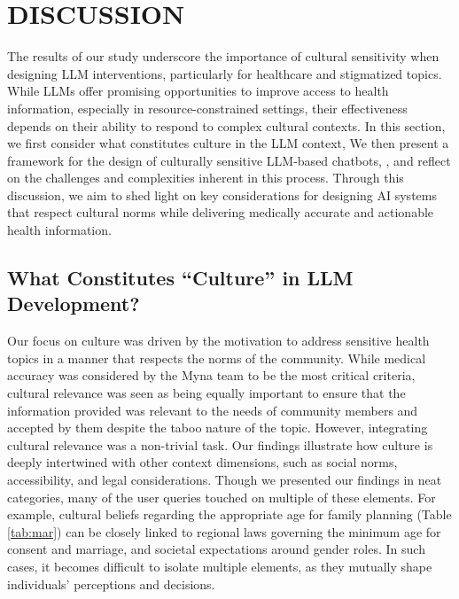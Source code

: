 \section{DISCUSSION}
The results of our study underscore the importance of cultural sensitivity when designing LLM interventions, particularly for healthcare and stigmatized topics. While LLMs offer promising opportunities to improve access to health information, especially in resource-constrained settings, their effectiveness depends on their ability to respond to complex cultural contexts. In this section, we first consider what constitutes culture in the LLM context,  We then present a framework for the design of culturally sensitive LLM-based chatbots, , and reflect on the challenges and complexities inherent in this process. 
Through this discussion, we aim to shed light on key considerations for designing AI systems that respect cultural norms while delivering medically accurate and actionable health information. 



\subsection{What Constitutes ``Culture'' in LLM Development?}
Our focus on culture was driven by the motivation to address sensitive health topics in a manner that respects the norms of the community. 
While medical accuracy was considered by the Myna team to be the most critical criteria, cultural relevance was seen as being equally important to ensure that the information provided was relevant to the needs of community members and accepted by them despite the taboo nature of the topic.
However, integrating cultural relevance was a non-trivial task. Our findings illustrate how culture is deeply intertwined with other context dimensions, such as social norms, accessibility, and legal considerations.
Though we presented our findings in neat categories, many of the user queries touched on multiple of these elements.
For example, cultural beliefs regarding the appropriate age for family planning (Table \ref{tab:mar}) can be closely linked to regional laws governing the minimum age for consent and marriage, and societal expectations around gender roles. In such cases, it becomes difficult to isolate multiple elements, as they mutually shape individuals' perceptions and decisions. 

